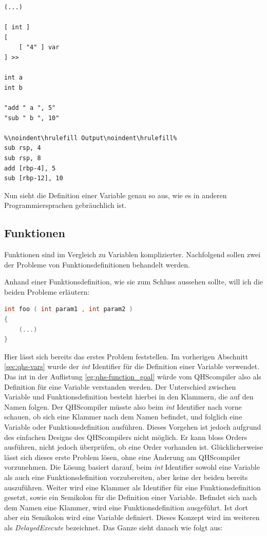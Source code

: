 \begin{lstlisting}[language=QHS, caption=Definition einer Variable mit \textit{int} Identifier]
(...)

[ int ] 
[
    [ "4" ] var
] >>
    
int a 
int b 
    
"add " a ", 5"
"sub " b ", 10"
        
%\noindent\hrulefill Output\noindent\hrulefill%
sub rsp, 4
sub rsp, 8
add [rbp-4], 5
sub [rbp-12], 10
\end{lstlisting}

Nun sieht die Definition einer Variable genau so aus, wie es in anderen Programmiersprachen gebräuchlich ist.

\subsection{Funktionen} \label{sec:qhs-funcs}
Funktionen sind im Vergleich zu Variablen komplizierter. Nachfolgend sollen zwei der Probleme von Funktionsdefinitionen behandelt werden.

Anhand einer Funktionsdefinition, wie sie zum Schluss aussehen sollte, will ich die beiden Probleme erläutern:


\begin{lstlisting}[language=C, label=eg:qhs-function_goal, caption=Ziel für die Definition einer Funktion in QHS]
int foo ( int param1 , int param2 )
{
    (...)
}
\end{lstlisting}

Hier lässt sich bereits das erstes Problem feststellen. Im vorherigen Abschnitt \ref{sec:qhs-vars} wurde der \textit{int} Identifier für die Definition einer Variable verwendet. 
Das int in der Auflistung \ref{eg:qhs-function_goal} würde vom QHScompiler also als Definition für eine Variable verstanden werden. Der Unterschied zwischen Variable und Funktionsdefinition besteht hierbei in den Klammern,
die auf den Namen folgen. Der QHScompiler müsste also beim \textit{int} Identifier nach vorne schauen, ob sich eine Klammer nach dem Namen befindet, und folglich eine Variable oder Funktionsdefinition ausführen.
Dieses Vorgehen ist jedoch aufgrund des einfachen Designs des QHScompilers nicht möglich. Er kann bloss Orders ausführen, nicht jedoch überprüfen, ob eine Order vorhanden ist. Glücklicherweise lässt sich dieses erste Problem lösen,
ohne eine Änderung am QHScompiler vorzunehmen. Die Lösung basiert darauf, beim \textit{int} Identifier sowohl eine Variable als auch eine Funktionsdefinition vorzubereiten, aber keine der beiden bereits auszuführen.
Weiter wird eine Klammer als Identifier für eine Funktionsdefinition gesetzt, sowie ein Semikolon für die Definition einer Variable. Befindet sich nach dem Namen eine Klammer, wird eine Funktionsdefinition ausgeführt.
Ist dort aber ein Semikolon wird eine Variable definiert. Dieses Konzept wird im weiteren als \textit{DelayedExecute} bezeichnet. Das Ganze sieht danach wie folgt aus:

